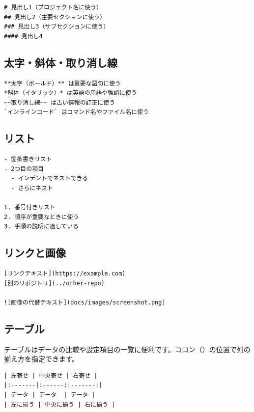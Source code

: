\begin{lstlisting}[language={}]
# 見出し1（プロジェクト名に使う）
## 見出し2（主要セクションに使う）
### 見出し3（サブセクションに使う）
#### 見出し4
\end{lstlisting}

\subsection{太字・斜体・取り消し線}

\begin{lstlisting}[language={}]
**太字（ボールド）** は重要な語句に使う
*斜体（イタリック）* は英語の用語や強調に使う
~~取り消し線~~ は古い情報の訂正に使う
`インラインコード` はコマンド名やファイル名に使う
\end{lstlisting}

\subsection{リスト}

\begin{lstlisting}[language={}]
- 箇条書きリスト
- 2つ目の項目
  - インデントでネストできる
  - さらにネスト

1. 番号付きリスト
2. 順序が重要なときに使う
3. 手順の説明に適している
\end{lstlisting}

\subsection{リンクと画像}

\begin{lstlisting}[language={}]
[リンクテキスト](https://example.com)
[別のリポジトリ](../other-repo)

![画像の代替テキスト](docs/images/screenshot.png)
\end{lstlisting}

\subsection{テーブル}

テーブルはデータの比較や設定項目の一覧に便利です。コロン（\cmd{:}）の位置で列の揃え方を指定できます。

\begin{lstlisting}[language={}]
| 左寄せ | 中央寄せ | 右寄せ |
|:-------|:------:|-------:|
| データ | データ  | データ |
| 左に揃う | 中央に揃う | 右に揃う |
\end{lstlisting}


